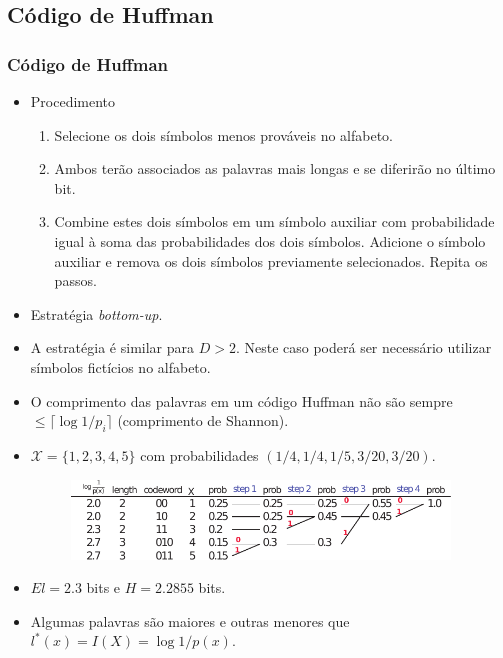\subsection{Código de Huffman}
\begin{frame}[allowframebreaks]
  \frametitle{Código de Huffman}
  \begin{itemize}
  \item Procedimento
	\begin{enumerate}
	\item Selecione os dois símbolos menos prováveis no alfabeto.
	\item Ambos terão associados as palavras mais longas e se diferirão no último bit.
	\item Combine estes dois símbolos em um símbolo auxiliar com probabilidade igual à soma das 
		probabilidades dos dois símbolos. Adicione o símbolo auxiliar e remova os dois símbolos previamente selecionados.
		Repita os passos.
	\end{enumerate}
  \item Estratégia \textit{bottom-up}.
  \item A estratégia é similar para $D > 2$. Neste caso poderá ser necessário utilizar símbolos fictícios no alfabeto.
  \item O comprimento das palavras em um código Huffman não são sempre $\leq \lceil \log 1/p_i \rceil$ (comprimento de Shannon).
  \end{itemize}

  \begin{example}
  \begin{itemize}
  \item $\mathcal{X} = \{1,2,3,4,5\}$ com probabilidades $(1/4, 1/4, 1/5, 3/20, 3/20)$.

         \begin{figure}[h!]
         \centering
         \includegraphics[width=0.95\textwidth]{images/ex-huffman01.pdf}
         \label{fig:ex-huffman01}
         \end{figure}

  \item $E l = 2.3$ bits e $H=2.2855$ bits.
  \item Algumas palavras são maiores e outras menores que $l^\ast(x) = I(X) = \log 1/p(x)$.
  \end{itemize}
  \end{example}


\end{frame}

